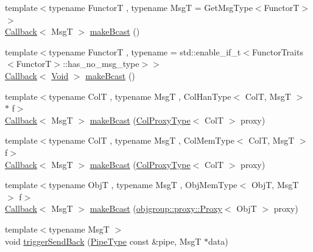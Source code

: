 \begin{DoxyCompactItemize}
\item 
{\footnotesize template$<$typename FunctorT , typename MsgT  = Get\+Msg\+Type$<$\+Functor\+T$>$$>$ }\\\hyperlink{namespacevt_a36db99df4c973d48b1118a293fff533f}{Callback}$<$ MsgT $>$ \hyperlink{structvt_1_1pipe_1_1_pipe_manager_a50e15818da3bc48ac9f129fbd30c3e31}{make\+Bcast} ()
\item 
{\footnotesize template$<$typename FunctorT , typename  = std\+::enable\+\_\+if\+\_\+t$<$\+Functor\+Traits$<$\+Functor\+T$>$\+::has\+\_\+no\+\_\+msg\+\_\+type$>$$>$ }\\\hyperlink{namespacevt_a36db99df4c973d48b1118a293fff533f}{Callback}$<$ \hyperlink{structvt_1_1pipe_1_1_pipe_manager_ab720c2580ecfd3ab36e49aeaaff64cc6}{Void} $>$ \hyperlink{structvt_1_1pipe_1_1_pipe_manager_a42e6860c842d31411b7d90154a0c6a17}{make\+Bcast} ()
\item 
{\footnotesize template$<$typename ColT , typename MsgT , Col\+Han\+Type$<$ Col\+T, Msg\+T $>$ $\ast$ f$>$ }\\\hyperlink{namespacevt_a36db99df4c973d48b1118a293fff533f}{Callback}$<$ MsgT $>$ \hyperlink{structvt_1_1pipe_1_1_pipe_manager_a1fefc503b58bbdf791e76a6c8f339df6}{make\+Bcast} (\hyperlink{structvt_1_1pipe_1_1_pipe_manager_t_l_af56c58cad882496e35f01227d4da3898}{Col\+Proxy\+Type}$<$ ColT $>$ proxy)
\item 
{\footnotesize template$<$typename ColT , typename MsgT , Col\+Mem\+Type$<$ Col\+T, Msg\+T $>$ f$>$ }\\\hyperlink{namespacevt_a36db99df4c973d48b1118a293fff533f}{Callback}$<$ MsgT $>$ \hyperlink{structvt_1_1pipe_1_1_pipe_manager_a6fb7d87f8beb2c1e80d492df47036158}{make\+Bcast} (\hyperlink{structvt_1_1pipe_1_1_pipe_manager_t_l_af56c58cad882496e35f01227d4da3898}{Col\+Proxy\+Type}$<$ ColT $>$ proxy)
\item 
{\footnotesize template$<$typename ObjT , typename MsgT , Obj\+Mem\+Type$<$ Obj\+T, Msg\+T $>$ f$>$ }\\\hyperlink{namespacevt_a36db99df4c973d48b1118a293fff533f}{Callback}$<$ MsgT $>$ \hyperlink{structvt_1_1pipe_1_1_pipe_manager_a4d561c17ce6861401a32892223e434c9}{make\+Bcast} (\hyperlink{structvt_1_1objgroup_1_1proxy_1_1_proxy}{objgroup\+::proxy\+::\+Proxy}$<$ ObjT $>$ proxy)
\item 
{\footnotesize template$<$typename MsgT $>$ }\\void \hyperlink{structvt_1_1pipe_1_1_pipe_manager_aaddd05d4eec8fbcbe8134f9c907a7306}{trigger\+Send\+Back} (\hyperlink{namespacevt_ac9852acda74d1896f48f406cd72c7bd3}{Pipe\+Type} const \&pipe, MsgT $\ast$data)

\end{DoxyCompactItemize}
